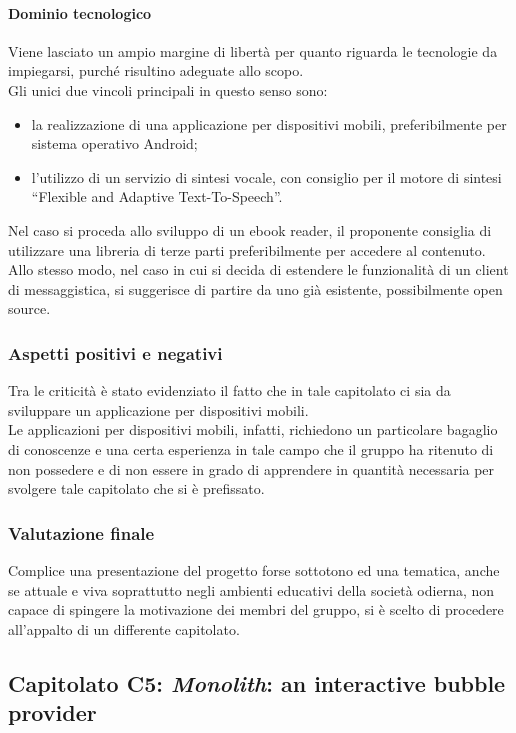 			\paragraph{Dominio tecnologico}
			Viene lasciato un ampio margine di libertà per quanto riguarda le tecnologie da impiegarsi, purché risultino adeguate allo scopo. 
			\\Gli unici due vincoli principali in questo senso sono:
			\begin{itemize}
			\item la realizzazione di una applicazione per dispositivi mobili, preferibilmente per sistema operativo Android;
			\item l'utilizzo di un servizio di sintesi vocale, con consiglio per il motore di sintesi “Flexible and Adaptive Text-To-Speech”.
			\end{itemize}
			Nel caso si proceda allo sviluppo di un ebook reader, il proponente consiglia di utilizzare una libreria di terze parti preferibilmente 
			 per accedere al contenuto. Allo stesso modo, nel caso in cui si decida di estendere le funzionalità di un client di messaggistica, 
			si suggerisce di partire da uno già esistente, possibilmente open source.
		\subsubsection{Aspetti positivi e negativi}
		Tra le criticità è stato evidenziato il fatto che in tale capitolato ci sia da sviluppare un applicazione per dispositivi mobili.
		\\Le applicazioni per dispositivi mobili, infatti, richiedono un particolare bagaglio di conoscenze e una certa esperienza in tale campo che
		il gruppo ha ritenuto di non possedere e di non essere in grado di apprendere in quantità necessaria per svolgere tale capitolato che si è prefissato.
		
		\subsubsection{Valutazione finale}
		Complice una presentazione del progetto forse sottotono ed una tematica, anche se attuale e viva soprattutto negli ambienti 
		educativi della società odierna, non capace di spingere la motivazione dei membri del gruppo, si è scelto di procedere all'appalto di un 
		differente capitolato.
		
	\subsection{Capitolato C5: \emph{Monolith}: an interactive bubble provider}
